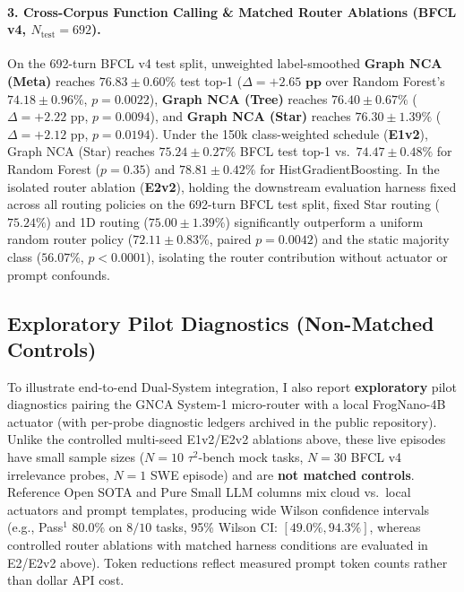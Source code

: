 \documentclass[10pt,twocolumn,letterpaper]{article}
\begin{document}
\paragraph{3. Cross-Corpus Function Calling \& Matched Router Ablations (BFCL v4, $N_{\text{test}}=692$).}
On the 692-turn BFCL v4 test split, unweighted label-smoothed \textbf{Graph NCA (Meta)} reaches $\mathbf{76.83 \pm 0.60\%}$ test top-1 ($\Delta = \mathbf{+2.65\text{ pp}}$ over Random Forest's $74.18 \pm 0.96\%$, $p = 0.0022$), \textbf{Graph NCA (Tree)} reaches $76.40 \pm 0.67\%$ ($\Delta = +2.22\text{ pp}$, $p = 0.0094$), and \textbf{Graph NCA (Star)} reaches $76.30 \pm 1.39\%$ ($\Delta = +2.12\text{ pp}$, $p = 0.0194$). Under the 150k class-weighted schedule (\textbf{E1v2}), Graph NCA (Star) reaches $75.24 \pm 0.27\%$ BFCL test top-1 vs.\ $74.47 \pm 0.48\%$ for Random Forest ($p = 0.35$) and $78.81 \pm 0.42\%$ for HistGradientBoosting. In the isolated router ablation (\textbf{E2v2}), holding the downstream evaluation harness fixed across all routing policies on the 692-turn BFCL test split, fixed Star routing ($75.24\%$) and 1D routing ($75.00 \pm 1.39\%$) significantly outperform a uniform random router policy ($72.11 \pm 0.83\%$, paired $p = 0.0042$) and the static majority class ($56.07\%$, $p < 0.0001$), isolating the router contribution without actuator or prompt confounds.

\subsection{Exploratory Pilot Diagnostics (Non-Matched Controls)}
\label{sec:exploratory-pilots}
\label{sec:live-benchmarks}

To illustrate end-to-end Dual-System integration, I also report \textbf{exploratory} pilot diagnostics pairing the GNCA System-1 micro-router with a local FrogNano-4B actuator (with per-probe diagnostic ledgers archived in the public repository). Unlike the controlled multi-seed E1v2/E2v2 ablations above, these live episodes have small sample sizes ($N=10$ $\tau^2$-bench mock tasks, $N=30$ BFCL v4 irrelevance probes, $N=1$ SWE episode) and are \textbf{not matched controls}. Reference Open SOTA and Pure Small LLM columns mix cloud vs.\ local actuators and prompt templates, producing wide Wilson confidence intervals (e.g., Pass$^1$ $80.0\%$ on $8/10$ tasks, 95\% Wilson CI: $[49.0\%, 94.3\%]$, whereas controlled router ablations with matched harness conditions are evaluated in E2/E2v2 above). Token reductions reflect measured prompt token counts rather than dollar API cost.
\end{document}

